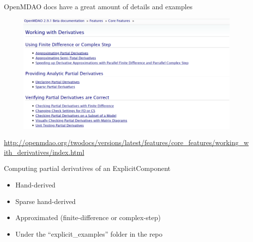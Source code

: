 \documentclass[aspectratio=169, usenames, dvipsnames, 14pt]{beamer}
\begin{document}
\begin{frame}{OpenMDAO docs have a great amount of details and examples}

	\begin{figure}
		\includegraphics[scale=.4]{images/slide_25_derivatives.png}
	\end{figure}
	\url{http://openmdao.org/twodocs/versions/latest/features/core_features/working_with_derivatives/index.html}
	
\end{frame}

\begingroup
{}
\begin{frame}{Computing partial derivatives of an ExplicitComponent}

	\begin{itemize}
		\item Hand-derived
		\item Sparse hand-derived
		\item Approximated (finite-difference or complex-step)
		\item Under the ``explicit\_examples'' folder in the repo
	\end{itemize}

\end{frame}
\endgroup
\end{document}
